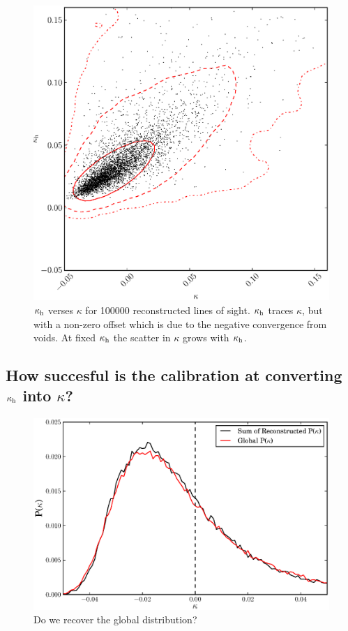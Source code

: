 \documentclass[useAMS,usenatbib]{mn2e}
\begin{document}
\begin{figure}
\includegraphics[width=\columnwidth]{figs/cornerplot.eps}
\caption[Biased?]{$\kappa_{\rm h}$ verses $\kappa$ for 100000 reconstructed lines of sight. $\kappa_{\rm h}$ traces $\kappa$, but with a non-zero offset which is due to the negative convergence from voids. At fixed $\kappa_{\rm h}$ the scatter in $\kappa$ grows with $\kappa_{\rm h}$.}
\label{fig:isitbiased}
\end{figure}


\subsection{How succesful is the calibration at converting $\kappa_{\rm h}$ into $\kappa$?}

\begin{figure}
\includegraphics[width=\columnwidth]{figs/globaldist.eps}
\caption[magcut]{Do we recover the global distribution?}
\label{fig:globaldist}
\end{figure}
\end{document}
